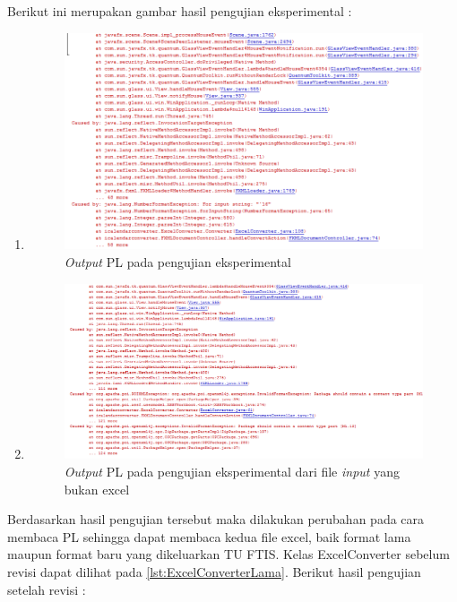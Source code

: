 Berikut ini merupakan gambar hasil pengujian eksperimental : 
\begin{enumerate}
	\item 
			\begin{figure}[H]
			\centering
			\includegraphics[scale=0.8]{Gambar/eksperimental}
			\caption{\textit{Output} PL pada pengujian eksperimental }
			\label{fig:eksperimental}
			\end{figure}
	
	\item
			\begin{figure}[H]
			\centering
			\includegraphics[scale=0.8]{Gambar/eksperimental2}
			\caption{\textit{Output} PL pada pengujian eksperimental dari file \textit{input} yang bukan excel}
			\label{fig:eksperimental2}
			\end{figure}		
\end{enumerate}

Berdasarkan hasil pengujian tersebut maka dilakukan perubahan pada cara membaca PL sehingga dapat membaca kedua file excel, baik format lama maupun format baru yang dikeluarkan TU FTIS. Kelas ExcelConverter sebelum revisi dapat dilihat pada \ref{lst:ExcelConverterLama}. Berikut hasil pengujian setelah revisi : 

